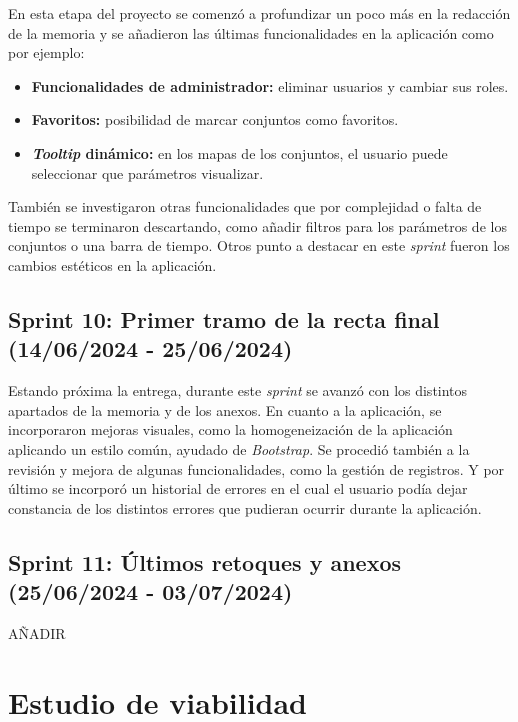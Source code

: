 En esta etapa del proyecto se comenzó a profundizar un poco más en la redacción de la memoria y se añadieron las últimas funcionalidades en la aplicación como por ejemplo:
\begin{itemize}
    \item \textbf{Funcionalidades de administrador:} eliminar usuarios y cambiar sus roles.
    \item \textbf{Favoritos:} posibilidad de marcar conjuntos como favoritos.
    \item \textbf{\textit{Tooltip} dinámico:} en los mapas de los conjuntos, el usuario puede seleccionar que parámetros visualizar.
\end{itemize}

También se investigaron otras funcionalidades que por complejidad o falta de tiempo se terminaron descartando, como añadir filtros para los parámetros de los conjuntos o una barra de tiempo.
Otros punto a destacar en este \textit{sprint} fueron los cambios estéticos en la aplicación.


\subsection{Sprint 10: Primer tramo de la recta final (14/06/2024 - 25/06/2024)}

Estando próxima la entrega, durante este \textit{sprint} se avanzó con los distintos apartados de la memoria y de los anexos.
En cuanto a la aplicación, se incorporaron mejoras visuales, como la homogeneización de la aplicación aplicando un estilo común, ayudado de \textit{Bootstrap}. Se procedió también a la revisión y mejora de algunas funcionalidades, como la gestión de registros. Y por último se incorporó un historial de errores en el cual el usuario podía dejar constancia de los distintos errores que pudieran ocurrir durante la aplicación.


\subsection{Sprint 11: Últimos retoques y anexos (25/06/2024 - 03/07/2024)}

AÑADIR

\section{Estudio de viabilidad}


